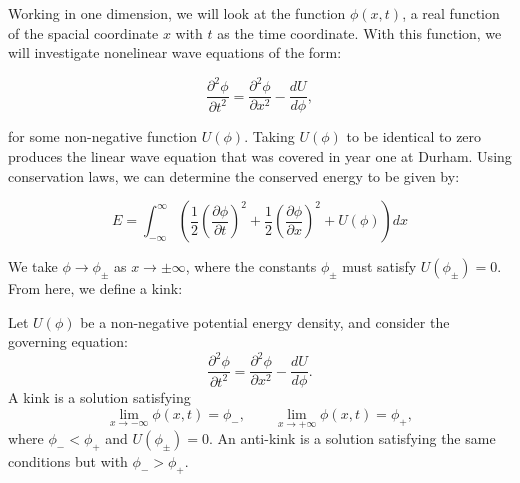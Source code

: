 \documentclass[a4paper]{report}
\begin{document}
Working in one dimension, we will look at the function \(\phi(x,t)\), a real function of the spacial coordinate \(x\) with \(t\) as the time coordinate. With this function, we will investigate nonelinear wave equations of the form:

\[\frac{\partial^2 \phi}{\partial t^2}=\frac{\partial^2 \phi}{\partial x^2}-\frac{d U}{d \phi},\]

for some non-negative function \(U(\phi)\). Taking \(U(\phi)\) to be identical to zero produces the linear wave equation that was covered in year one at Durham. Using conservation laws, we can determine the conserved energy to be given by:

\[E=\int_{-\infty}^{\infty}\left(\frac{1}{2}\left(\frac{\partial \phi}{\partial t}\right)^2+\frac{1}{2}\left(\frac{\partial \phi}{\partial x}\right)^2+U(\phi)\right) d x\]

We take \(\phi \rightarrow \phi_{\pm}\) as \(x\rightarrow \pm \infty\), where the constants \(\phi_{\pm}\) must satisfy \(U(\phi_{\pm}) =0\). From here, we define a kink:

\begin{definition}
  Let \(U(\phi)\) be a non-negative potential energy density, and consider the governing equation:
  \[
  \frac{\partial^2 \phi}{\partial t^2}
  =
  \frac{\partial^2 \phi}{\partial x^2}
  -
  \frac{d U}{d \phi}.
  \]
  A kink is a solution satisfying
  \[
  \lim_{x\to-\infty}\phi(x,t)=\phi_{-},
  \qquad
  \lim_{x\to+\infty}\phi(x,t)=\phi_{+},
  \]
  where \(\phi_{-}<\phi_{+}\) and \(U(\phi_{\pm})=0\). An anti-kink is a solution satisfying the same conditions but with \(\phi_{-}>\phi_{+}\).
\end{definition}
\end{document}
